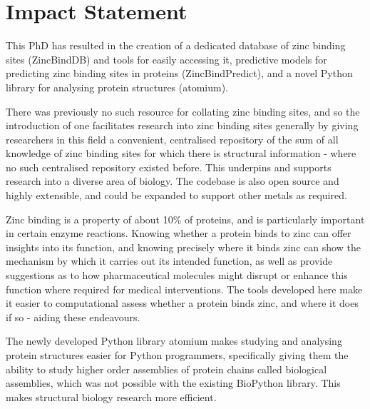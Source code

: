 \documentclass[a4paper, 11pt, oneside]{Style/UCLThesis}  %
\begin{document}
\chapter{Impact Statement}

This PhD has resulted in the creation of a dedicated database of zinc binding sites (ZincBindDB) and tools for easily accessing it, predictive models for predicting zinc binding sites in proteins (ZincBindPredict), and a novel Python library for analysing protein structures (atomium).

There was previously no such resource for collating zinc binding sites, and so the introduction of one facilitates research into zinc binding sites generally by giving researchers in this field a convenient, centralised repository of the sum of all knowledge of zinc binding sites for which there is structural information - where no such centralised repository existed before. This underpins and supports research into a diverse area of biology. The codebase is also open source and highly extensible, and could be expanded to support other metals as required.

Zinc binding is a property of about 10\% of proteins, and is particularly important in certain enzyme reactions. Knowing whether a protein binds to zinc can offer insights into its function, and knowing precisely where it binds zinc can show the mechanism by which it carries out its intended function, as well as provide suggestions as to how pharmaceutical molecules might disrupt or enhance this function where required for medical interventions. The tools developed here make it easier to computational assess whether a protein binds zinc, and where it does if so - aiding these endeavours.

The newly developed Python library atomium makes studying and analysing protein structures easier for Python programmers, specifically giving them the ability to study higher order assemblies of protein chains called biological assemblies, which was not possible with the existing BioPython library. This makes structural biology research more efficient.


\clearpage  %
\end{document}
